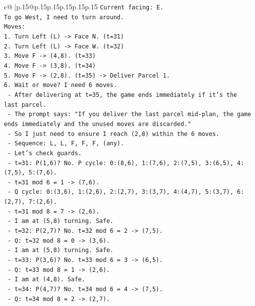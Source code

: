 \documentclass{article}
\begin{document}
{\begin{supertabular}{c@{$\;$}|p{.15\linewidth}@{}p{.15\linewidth}p{.15\linewidth}p{.15\linewidth}p{.15\linewidth}p{.15\linewidth}}
{{{\texttt{Current facing: E.} \\
\texttt{To go West, I need to turn around.} \\
\texttt{Moves:} \\
\texttt{1. Turn Left (L) {-}> Face N. (t=31)} \\
\texttt{2. Turn Left (L) {-}> Face W. (t=32)} \\
\texttt{3. Move F {-}> (4,8). (t=33)} \\
\texttt{4. Move F {-}> (3,8). (t=34)} \\
\texttt{5. Move F {-}> (2,8). (t=35) {-}> Deliver Parcel 1.} \\
\texttt{6. Wait or move? I need 6 moves.} \\
\texttt{   {-} After delivering at t=35, the game ends immediately if it's the last parcel.} \\
\texttt{   {-} The prompt says: "If you deliver the last parcel mid{-}plan, the game ends immediately and the unused moves are discarded."} \\
\texttt{   {-} So I just need to ensure I reach (2,8) within the 6 moves.} \\
\texttt{   {-} Sequence: L, L, F, F, F, (any).} \\
\texttt{   {-} Let's check guards.} \\
\texttt{     {-} t=31: P(1,6)? No. P cycle: 0:(8,6), 1:(7,6), 2:(7,5), 3:(6,5), 4:(7,5), 5:(7,6).} \\
\texttt{       {-} t=31 mod 6 = 1 {-}> (7,6).} \\
\texttt{       {-} Q cycle: 0:(3,6), 1:(2,6), 2:(2,7), 3:(3,7), 4:(4,7), 5:(3,7), 6:(2,7), 7:(2,6).} \\
\texttt{       {-} t=31 mod 8 = 7 {-}> (2,6).} \\
\texttt{       {-} I am at (5,8) turning. Safe.} \\
\texttt{     {-} t=32: P(2,7)? No. t=32 mod 6 = 2 {-}> (7,5).} \\
\texttt{       {-} Q: t=32 mod 8 = 0 {-}> (3,6).} \\
\texttt{       {-} I am at (5,8) turning. Safe.} \\
\texttt{     {-} t=33: P(3,6)? No. t=33 mod 6 = 3 {-}> (6,5).} \\
\texttt{       {-} Q: t=33 mod 8 = 1 {-}> (2,6).} \\
\texttt{       {-} I am at (4,8). Safe.} \\
\texttt{     {-} t=34: P(4,7)? No. t=34 mod 6 = 4 {-}> (7,5).} \\
\texttt{       {-} Q: t=34 mod 8 = 2 {-}> (2,7).} \\
}}}
\end{supertabular}}
\end{document}

